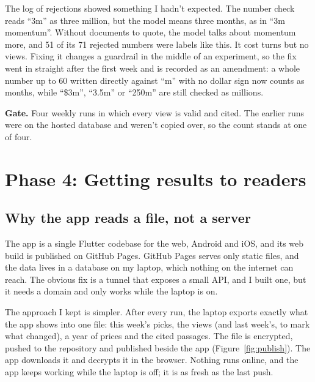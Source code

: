 \documentclass[11pt,a4paper]{article}
\begin{document}
The log of rejections showed something I hadn't expected. The number check reads ``3m'' as three million,
but the model means three months, as in ``3m momentum''. Without documents to quote, the model talks about
momentum more, and 51 of its 71 rejected numbers were labels like this. It cost turns but no views. Fixing
it changes a guardrail in the middle of an experiment, so the fix went in straight after the first week and
is recorded as an amendment: a whole number up to 60 written directly against ``m'' with no dollar sign now
counts as months, while ``\$3m'', ``3.5m'' or ``250m'' are still checked as millions.

\textbf{Gate.} Four weekly runs in which every view is valid and cited. The earlier runs were on the hosted
database and weren't copied over, so the count stands at one of four.

\section{Phase 4: Getting results to readers}

\subsection{Why the app reads a file, not a server}

The app is a single Flutter codebase for the web, Android and iOS, and its web build is published on
GitHub Pages. GitHub Pages serves only static files, and the data lives in a database on my laptop, which
nothing on the internet can reach. The obvious fix is a tunnel that exposes a small API, and I built one,
but it needs a domain and only works while the laptop is on.

The approach I kept is simpler. After every run, the laptop exports exactly what the app shows into one
file: this week's picks, the views (and last week's, to mark what changed), a year of prices and the cited
passages. The file is encrypted, pushed to the repository and published beside the app
(Figure~\ref{fig:publish}). The app downloads it and decrypts it in the browser. Nothing runs online, and
the app keeps working while the laptop is off; it is as fresh as the last push.
\end{document}
